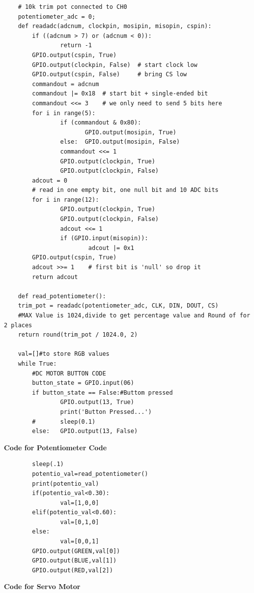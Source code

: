 \documentclass[12pt,a4paper]{article}
\begin{document}
\begin{flushleft}
\begin{lstlisting}
    # 10k trim pot connected to CH0
    potentiometer_adc = 0;
    def readadc(adcnum, clockpin, mosipin, misopin, cspin):
        if ((adcnum > 7) or (adcnum < 0)):
                return -1
        GPIO.output(cspin, True)
        GPIO.output(clockpin, False)  # start clock low
        GPIO.output(cspin, False)     # bring CS low
        commandout = adcnum
        commandout |= 0x18  # start bit + single-ended bit
        commandout <<= 3    # we only need to send 5 bits here
        for i in range(5):
                if (commandout & 0x80):
                       GPIO.output(mosipin, True)
                else:  GPIO.output(mosipin, False)
                commandout <<= 1
                GPIO.output(clockpin, True)
                GPIO.output(clockpin, False)
        adcout = 0
        # read in one empty bit, one null bit and 10 ADC bits
        for i in range(12):
                GPIO.output(clockpin, True)
                GPIO.output(clockpin, False)
                adcout <<= 1
                if (GPIO.input(misopin)):
                        adcout |= 0x1
        GPIO.output(cspin, True)
        adcout >>= 1    # first bit is 'null' so drop it
        return adcout

    def read_potentiometer():
    trim_pot = readadc(potentiometer_adc, CLK, DIN, DOUT, CS)
    #MAX Value is 1024,divide to get percentage value and Round of for 2 places
    return round(trim_pot / 1024.0, 2)

    val=[]#to store RGB values
    while True:
        #DC MOTOR BUTTON CODE
        button_state = GPIO.input(06)
        if button_state == False:#Buttom pressed
                GPIO.output(13, True)
                print('Button Pressed...')
        #       sleep(0.1)
        else:   GPIO.output(13, False)
 \end{lstlisting}
 
\textbf{Code for Potentiometer Code}
 \begin{lstlisting}
        sleep(.1)
        potentio_val=read_potentiometer()
        print(potentio_val)
        if(potentio_val<0.30):
                val=[1,0,0]     
        elif(potentio_val<0.60):
                val=[0,1,0]
        else:
                val=[0,0,1]
        GPIO.output(GREEN,val[0])
        GPIO.output(BLUE,val[1])
        GPIO.output(RED,val[2])
\end{lstlisting}

\textbf{Code for Servo Motor}


\end{flushleft}
\end{document}
